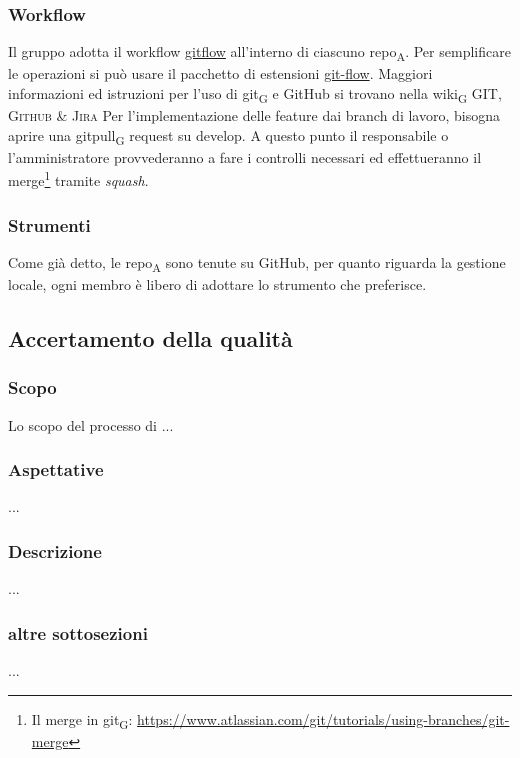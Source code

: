     \subsubsection{Workflow}
        Il gruppo adotta il workflow \href{https://www.atlassian.com/git/tutorials/comparing-workflows/gitflow-workflow}{gitflow} all'interno di ciascuno \acrshort{repo}\textsubscript{A}. Per semplificare le operazioni si può usare il pacchetto di estensioni \href{http://danielkummer.github.io/git-flow-cheatsheet/}{git-flow}. Maggiori informazioni ed istruzioni per l'uso di \gls{git}\textsubscript{G} e GitHub si trovano nella \gls{wiki}\textsubscript{G} \textsc{GIT, Github \& Jira}
            Per l'implementazione delle feature dai branch di lavoro, bisogna aprire una \gls{gitpull}\textsubscript{G} request su develop. A questo punto il responsabile o l'amministratore provvederanno a fare i controlli necessari ed effettueranno il merge\footnote{Il merge in \gls{git}\textsubscript{G}: \url{https://www.atlassian.com/git/tutorials/using-branches/git-merge}} tramite \textit{squash}.

    \subsubsection{Strumenti}
        Come già detto, le \acrshort{repo}\textsubscript{A} sono tenute su GitHub, per quanto riguarda la gestione locale, ogni membro è libero di adottare lo strumento che preferisce.

\subsection{Accertamento della qualità} %
    \subsubsection{Scopo}
        Lo scopo del processo di ...
    \subsubsection{Aspettative}
        ...
    \subsubsection{Descrizione}
        ...
    \subsubsection{altre sottosezioni}
        ...

